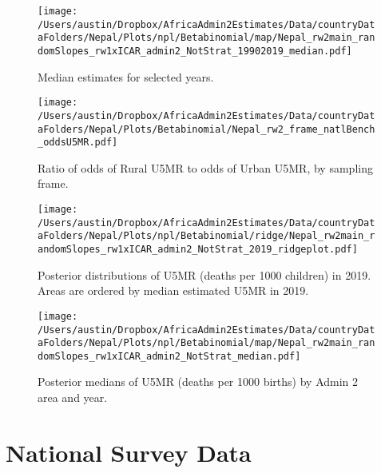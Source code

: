 \documentclass[]{article}
\begin{document}
\begin{figure}
\centering
\texttt{[image: /Users/austin/Dropbox/AfricaAdmin2Estimates/Data/countryDataFolders/Nepal/Plots/npl/Betabinomial/map/Nepal\_rw2main\_randomSlopes\_rw1xICAR\_admin2\_NotStrat\_19902019\_median.pdf]}
\caption{Median estimates for selected years.}
\end{figure}
\clearpage

\begin{figure}
    \centering
    \texttt{[image: /Users/austin/Dropbox/AfricaAdmin2Estimates/Data/countryDataFolders/Nepal/Plots/Betabinomial/Nepal\_rw2\_frame\_natlBench\_oddsU5MR.pdf]}
    \caption{Ratio of odds of Rural U5MR to odds of Urban U5MR, by sampling frame.}
\end{figure}
\clearpage



\begin{figure}
\centering
\texttt{[image: /Users/austin/Dropbox/AfricaAdmin2Estimates/Data/countryDataFolders/Nepal/Plots/npl/Betabinomial/ridge/Nepal\_rw2main\_randomSlopes\_rw1xICAR\_admin2\_NotStrat\_2019\_ridgeplot.pdf]}
\caption{Posterior distributions of U5MR (deaths per 1000 children) in 2019. Areas are ordered by median estimated U5MR in 2019.}
\end{figure}
\clearpage
\begin{figure}
\centering
\texttt{[image: /Users/austin/Dropbox/AfricaAdmin2Estimates/Data/countryDataFolders/Nepal/Plots/npl/Betabinomial/map/Nepal\_rw2main\_randomSlopes\_rw1xICAR\_admin2\_NotStrat\_median.pdf]}
\caption{Posterior medians of U5MR (deaths per 1000 births) by Admin 2 area and year.}
\end{figure}
\clearpage

\hypertarget{national-survey-data}{%
\section{National Survey Data}\label{national-survey-data}}
\end{document}
